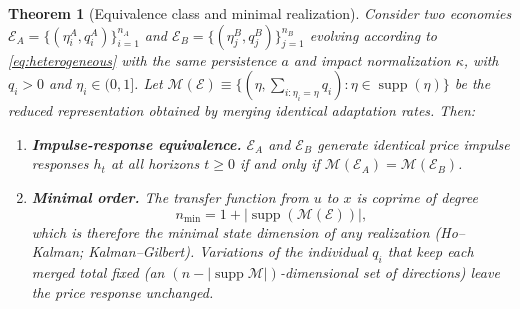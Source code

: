 \documentclass[10pt,twocolumn,letterpaper]{article}
\newtheorem{theorem}{Theorem}[section]
\theoremstyle{definition}
\theoremstyle{remark}
\begin{document}
\begin{theorem}[Equivalence class and minimal realization]
\label{thm:m1_equivalence}
Consider two economies $\mathcal{E}_A = \{(\eta_i^A, q_i^A)\}_{i=1}^{n_A}$ and $\mathcal{E}_B = \{(\eta_j^B, q_j^B)\}_{j=1}^{n_B}$ evolving according to \eqref{eq:heterogeneous} with the same persistence $a$ and impact normalization $\kappa$, with $q_i>0$ and $\eta_i\in(0,1]$. Let $\mathcal{M}(\mathcal{E}) \equiv \{(\eta, \sum_{i: \eta_i = \eta} q_i) : \eta \in \operatorname{supp}(\eta)\}$ be the reduced representation obtained by merging identical adaptation rates. Then:
\begin{enumerate}
    \item \textbf{Impulse-response equivalence.} $\mathcal{E}_A$ and $\mathcal{E}_B$ generate identical price impulse responses $h_t$ at all horizons $t \ge 0$ if and only if $\mathcal{M}(\mathcal{E}_A) = \mathcal{M}(\mathcal{E}_B)$.
    \item \textbf{Minimal order.} The transfer function from $u$ to $x$ is coprime of degree
    \begin{equation}
        n_{\min} = 1 + |\operatorname{supp}(\mathcal{M}(\mathcal{E}))|,
        \label{eq:minimal_order}
    \end{equation}
    which is therefore the minimal state dimension of any realization (Ho--Kalman; Kalman--Gilbert). Variations of the individual $q_i$ that keep each merged total fixed (an $(n-|\operatorname{supp}\mathcal{M}|)$-dimensional set of directions) leave the price response unchanged.
\end{enumerate}
\end{theorem}
\end{document}
